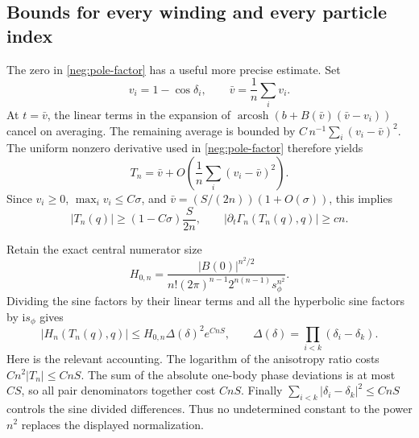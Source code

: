\documentclass[11pt]{article}
\numberwithin{equation}{section}
\theoremstyle{definition}
\newcommand{\ii}{\mathrm i}
\begin{document}
\subsection{Bounds for every winding and every particle index}
\label{neg:all-windings}

The zero in \eqref{neg:pole-factor} has a useful more precise
estimate.  Set
\[
 v_i=1-\cos\delta_i,\qquad \bar v=\frac1n\sum_i v_i .
 \]
At \(t=\bar v\), the linear terms in the expansion of
\(\operatorname{arcosh}(b+B(\bar v)(\bar v-v_i))\) cancel on
averaging.  The remaining average is bounded by
\(C\,n^{-1}\sum_i(v_i-\bar v)^2\).  The uniform nonzero
derivative used in \eqref{neg:pole-factor} therefore yields
\[
 T_n=\bar v+
       O\!\left(\frac1n\sum_i(v_i-\bar v)^2\right).
 \]
Since \(v_i\ge0\), \(\max_i v_i\le C\sigma\), and
\(\bar v=(S/(2n))(1+O(\sigma))\), this implies
\begin{equation}
 |T_n(q)|\ge(1-C\sigma)\frac{S}{2n},
 \qquad
 |\partial_t\Gamma_n(T_n(q),q)|\ge cn .
 \label{neg:pole-lower}
\end{equation}

Retain the exact central numerator size
\begin{equation}
 H_{0,n}=
 \frac{|B(0)|^{n^2/2}}
 {n!(2\pi)^{n-1}2^{n(n-1)}s_\phi^{n^2}} .
 \label{neg:H0}
\end{equation}
Dividing the sine factors by their linear terms and all the
hyperbolic sine factors by \(\ii s_\phi\) gives
\begin{equation}
 |H_n(T_n(q),q)|
 \le H_{0,n}\Delta(\delta)^2e^{CnS},
 \qquad
 \Delta(\delta)=\prod_{i<k}(\delta_i-\delta_k).
 \label{neg:pole-density-upper}
\end{equation}
Here is the relevant accounting.  The logarithm of the anisotropy
ratio costs \(Cn^2|T_n|\le CnS\).  The sum of the absolute
one-body phase deviations is at most \(CS\), so all pair
denominators together cost \(CnS\).  Finally
\(\sum_{i<k}|\delta_i-\delta_k|^2\le CnS\) controls the sine
divided differences.  Thus no undetermined constant to the power
\(n^2\) replaces the displayed normalization.
\end{document}
